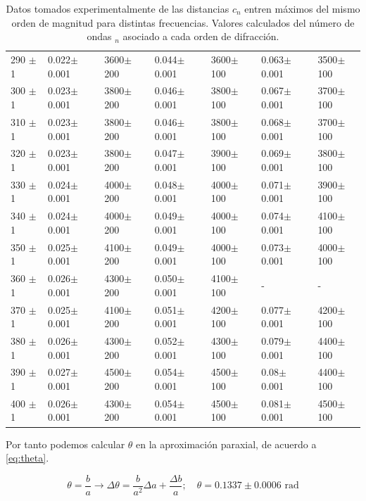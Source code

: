 \begin{table}[H]
\begin{minipage}{\textwidth}
\begin{tabular}{C{1.5cm}|C{2cm}| C{1.8cm}|C{2cm}| C{1.8cm}|C{2cm}|C{1.8cm}}
			290	$\pm$1 &	0.022$\pm$0.001 & 3600$\pm$ 200 & 0.044$\pm$0.001 &3600$\pm$ 100 & 0.063$\pm$0.001 & 3500$\pm$100  \\
			300	$\pm$1 &	0.023$\pm$0.001 & 3800$\pm$ 200 & 0.046$\pm$0.001 &3800$\pm$ 100 & 0.067$\pm$0.001 & 3700$\pm$100  \\
			310	$\pm$1 &	0.023$\pm$0.001 & 3800$\pm$ 200 & 0.046$\pm$0.001 &3800$\pm$ 100 & 0.068$\pm$0.001 & 3700$\pm$100  \\
			320	$\pm$1 &	0.023$\pm$0.001 & 3800$\pm$ 200 & 0.047$\pm$0.001 &3900$\pm$ 100 & 0.069$\pm$0.001 & 3800$\pm$100  \\
			330	$\pm$1 &	0.024$\pm$0.001 & 4000$\pm$ 200 & 0.048$\pm$0.001 &4000$\pm$ 100 & 0.071$\pm$0.001 & 3900$\pm$100  \\
			340	$\pm$1 &	0.024$\pm$0.001 & 4000$\pm$ 200 & 0.049$\pm$0.001 &4000$\pm$ 100 & 0.074$\pm$0.001 & 4100$\pm$100  \\
			350	$\pm$1 &	0.025$\pm$0.001 & 4100$\pm$ 200 & 0.049$\pm$0.001 &4000$\pm$ 100 & 0.073$\pm$0.001 & 4000$\pm$100  \\
			360	$\pm$1 &	0.026$\pm$0.001 & 4300$\pm$ 200 & 0.050$\pm$0.001 &4100$\pm$ 100 & -               & -          \\
			370	$\pm$1 &	0.025$\pm$0.001 & 4100$\pm$ 200 & 0.051$\pm$0.001 &4200$\pm$ 100 & 0.077$\pm$0.001 & 4200$\pm$100  \\
			380	$\pm$1 &	0.026$\pm$0.001 & 4300$\pm$ 200 & 0.052$\pm$0.001 &4300$\pm$ 100 & 0.079$\pm$0.001 & 4400$\pm$100  \\
			390	$\pm$1 &	0.027$\pm$0.001 & 4500$\pm$ 200 & 0.054$\pm$0.001 &4500$\pm$ 100 & 0.08$\pm$0.001  & 4400$\pm$100  \\
			400	$\pm$1 &	0.026$\pm$0.001 & 4300$\pm$ 200 & 0.054$\pm$0.001 &4500$\pm$ 100 & 0.081$\pm$0.001 & 4500$\pm$100  \\
			\bottomrule
			\bottomrule		
		\end{tabular}
		\caption{ \small Datos tomados experimentalmente de las distancias $c_n$  entren máximos del mismo orden de magnitud para distintas frecuencias. Valores calculados del número de ondas $_n$ asociado a cada orden de difracción.}
		\label{tab:cks}
	\end{minipage}
\end{table}

\clearpage

Por tanto podemos calcular $\theta$ en la aproximación paraxial, de acuerdo a \ref{eq:theta}.

\vspace{\baselineskip}
\begin{equation}\label{eq:theta}
	\theta = \frac{b}{a} \rightarrow \Delta \theta = \frac{b}{a^2}\Delta a + \frac{\Delta b}{a}; \quad \theta = 0.1337\pm0.0006 \text{ rad}
\end{equation}


